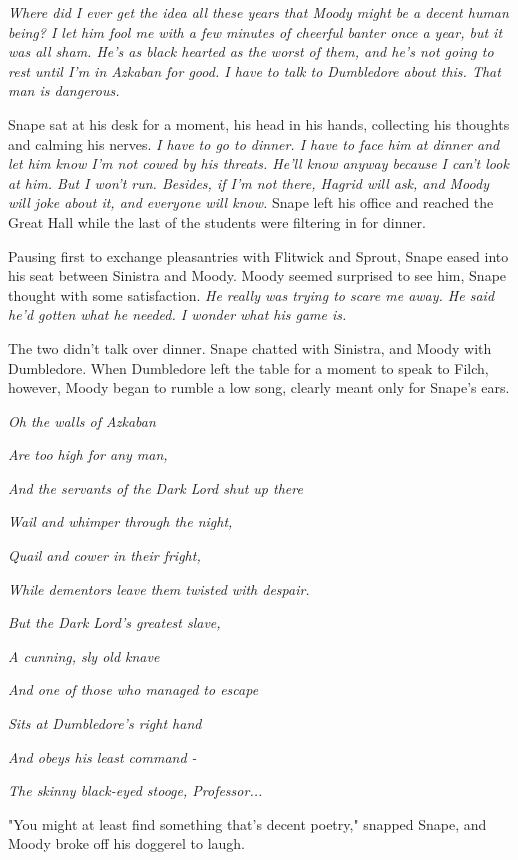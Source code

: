\emph{Where did I ever get the idea all these years that Moody might be a decent human being? I let him fool me with a few minutes of cheerful banter once a year, but it was all sham. He's as black hearted as the worst of them, and he's not going to rest until I'm in Azkaban for good. I have to talk to Dumbledore about this. That man is dangerous.}

Snape sat at his desk for a moment, his head in his hands, collecting his thoughts and calming his nerves. \emph{I have to go to dinner. I have to face him at dinner and let him know I'm not cowed by his threats. He'll know anyway because I can't look at him. But I won't run. Besides, if I'm not there, Hagrid will ask, and Moody will joke about it, and everyone will know.} Snape left his office and reached the Great Hall while the last of the students were filtering in for dinner.

Pausing first to exchange pleasantries with Flitwick and Sprout, Snape eased into his seat between Sinistra and Moody. Moody seemed surprised to see him, Snape thought with some satisfaction. \emph{He really was trying to scare me away. He said he'd gotten what he needed. I wonder what his game is.}

The two didn't talk over dinner. Snape chatted with Sinistra, and Moody with Dumbledore. When Dumbledore left the table for a moment to speak to Filch, however, Moody began to rumble a low song, clearly meant only for Snape's ears.

\emph{Oh the walls of Azkaban}

\emph{Are too high for any man,}

\emph{And the servants of the Dark Lord shut up there}

\emph{Wail and whimper through the night,}

\emph{Quail and cower in their fright,}

\emph{While dementors leave them twisted with despair.}

\emph{But the Dark Lord's greatest slave,}

\emph{A cunning, sly old knave}

\emph{And one of those who managed to escape}

\emph{Sits at Dumbledore's right hand}

\emph{And obeys his least command -}

\emph{The skinny black-eyed stooge, Professor...}

"You might at least find something that's decent poetry," snapped Snape, and Moody broke off his doggerel to laugh.

